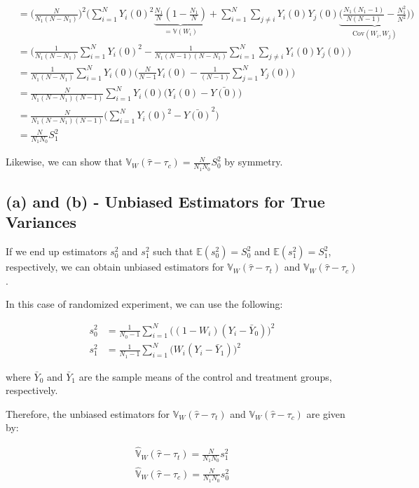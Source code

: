 \documentclass[11pt]{article}
\numberwithin{equation}{section}
\newcommand{\E}{\mathbb{E}}
\newcommand{\Var}{\mathbb{V}}
\begin{document}
\begin{align*}
    &= \biggl(\frac{N}{N_1(N-N_1)}\biggr)^2\biggl(\sum_{i=1}^NY_i(0)^2\underbrace{\frac{N_1}{N}(1-\frac{N_1}{N})}_{=\Var(W_i)} + \sum_{i=1}^N\sum_{j\neq i} Y_i(0)Y_j(0)\underbrace{\biggl(\frac{N_1(N_1-1)}{N(N-1)} - \frac{N_1^2}{N^2}\biggr)}_{\mathrm{Cov}(W_i, W_j)}\biggr)\\
    &= \biggl(\frac{1}{N_1(N-N_1)}\sum_{i=1}^NY_i(0)^2 - \frac{1}{N_1(N-1)(N-N_1)}\sum_{i=1}^N\sum_{j\neq i} Y_i(0)Y_j(0)\biggr)\\
    &= \frac{1}{N_1(N-N_1)}\sum_{i=1}^N Y_i(0)\biggl(\frac{N}{N-1}Y_i(0) - \frac{1}{(N-1)} \sum_{j=1}^N Y_j(0)\biggr)\\
    &= \frac{N}{N_1(N-N_1)(N-1)}\sum_{i=1}^N Y_i(0)\biggl(Y_i(0) - \bar{Y(0)} \biggr)\\
    &= \frac{N}{N_1(N-N_1)(N-1)}\biggl(\sum_{i=1}^N Y_i(0)^2 - \bar{Y(0)}^2 \biggr)\\
    &= \frac{N}{N_1N_0}S_1^2
\end{align*}


Likewise, we can show that $\Var_W(\hat\tau - \tau_c) = \frac{N}{N_1N_0}S_0^2$ by symmetry.

\subsection*{(a) and (b) - Unbiased Estimators for True Variances}

If we end up estimators $s_0^2$ and $s_1^2$ such that $\E(s_0^2) = S_0^2$ and $\E(s_1^2) = S_1^2$, respectively, we can obtain unbiased estimators for $\Var_W(\hat\tau - \tau_t)$ and $\Var_W(\hat\tau - \tau_c)$.

In this case of randomized experiment, we can use the following:

\begin{align}
    s_0^2 &= \frac{1}{N_0-1}\sum_{i=1}^N \bigl((1-W_i)(Y_i - \bar{Y}_0)\bigr)^2\label{eq:s_0^2}\\
    s_1^2 &= \frac{1}{N_1-1}\sum_{i=1}^N \bigl(W_i(Y_i - \bar{Y}_1)\bigr)^2\label{eq:s_1^2}
\end{align}

where $\bar{Y}_0$ and $\bar{Y}_1$ are the sample means of the control and treatment groups, respectively.


Therefore, the unbiased estimators for $\Var_W(\hat\tau - \tau_t)$ and $\Var_W(\hat\tau - \tau_c)$ are given by:

\begin{align}
    \hat{\Var}_W(\hat\tau - \tau_t) = \frac{N}{N_1N_0}s_1^2\label{eq:hat_var_tau_t}\\
    \hat{\Var}_W(\hat\tau - \tau_c) = \frac{N}{N_1N_0}s_0^2\label{eq:hat_var_tau_c}
\end{align}
\end{document}
